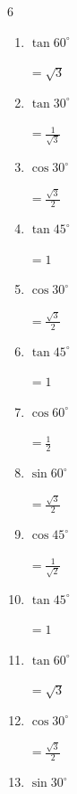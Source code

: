 \begin{multicols}{6}
\begin{enumerate}
        $\displaystyle =\frac{1}{\sqrt{3}}$

  \item $\displaystyle \tan{60^\circ}$

        $\displaystyle =\sqrt{3}$

  \item $\displaystyle \tan{30^\circ}$

        $\displaystyle =\frac{1}{\sqrt{3}}$

  \item $\displaystyle \cos{30^\circ}$

        $\displaystyle =\frac{\sqrt{3}}{2}$

  \item $\displaystyle \tan{45^\circ}$

        $\displaystyle =1$

  \item $\displaystyle \cos{30^\circ}$

        $\displaystyle =\frac{\sqrt{3}}{2}$

  \item $\displaystyle \tan{45^\circ}$

        $\displaystyle =1$

  \item $\displaystyle \cos{60^\circ}$

        $\displaystyle =\frac{1}{2}$

  \item $\displaystyle \sin{60^\circ}$

        $\displaystyle =\frac{\sqrt{3}}{2}$

  \item $\displaystyle \cos{45^\circ}$

        $\displaystyle =\frac{1}{\sqrt{2}}$

  \item $\displaystyle \tan{45^\circ}$

        $\displaystyle =1$

\columnbreak %

  \item $\displaystyle \tan{60^\circ}$

        $\displaystyle =\sqrt{3}$

  \item $\displaystyle \cos{30^\circ}$

        $\displaystyle =\frac{\sqrt{3}}{2}$

  \item $\displaystyle \sin{30^\circ}$


\end{enumerate}
\end{multicols}
